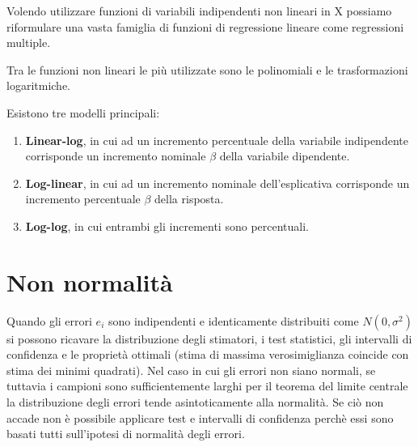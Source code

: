 \documentclass[a4page, 11pt]{article} %
\begin{document}
Volendo utilizzare funzioni di variabili indipendenti non lineari in X possiamo riformulare una vasta famiglia di funzioni di regressione lineare come regressioni multiple.

Tra le funzioni non lineari le più utilizzate sono le polinomiali e le trasformazioni logaritmiche. 

Esistono tre modelli principali: %
\begin{enumerate}[noitemsep]
\item \textbf{Linear-log}, in cui ad un incremento percentuale della variabile indipendente corrisponde un incremento nominale %
 $\beta$ della variabile dipendente.
\item \textbf{Log-linear}, in cui ad un incremento nominale dell’esplicativa corrisponde un incremento percentuale $\beta$ della risposta.
\item \textbf{Log-log}, in cui entrambi gli incrementi sono percentuali.
\end{enumerate}

\section{Non normalità}

Quando gli errori $e_i$ sono indipendenti e identicamente distribuiti come $N(0,\sigma^{2})$ si possono ricavare la distribuzione degli stimatori, i test statistici, gli intervalli di confidenza e le proprietà ottimali (stima di massima verosimiglianza coincide con stima dei minimi quadrati). 
Nel caso in cui gli errori non siano normali, se tuttavia i campioni sono sufficientemente larghi per il teorema del limite centrale la distribuzione degli errori tende asintoticamente alla normalità. Se ciò non accade non è possibile applicare test e intervalli di confidenza perchè essi sono basati tutti sull’ipotesi di normalità degli errori.
\end{document}

